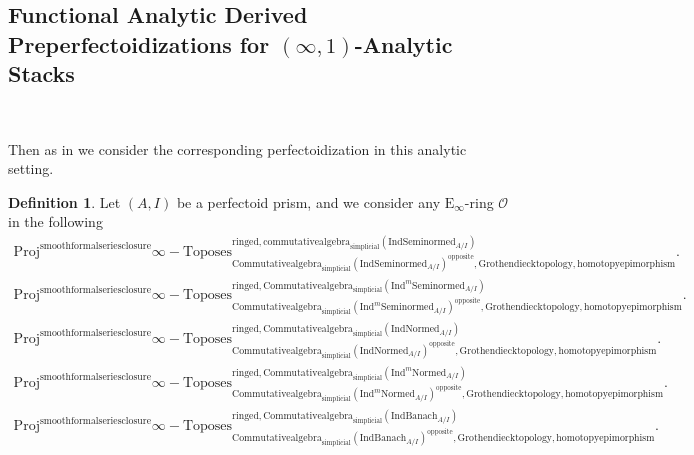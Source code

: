 \documentclass[11pt]{book}
\theoremstyle{definition}
\newtheorem{definition}[theorem]{Definition}
\numberwithin{equation}{section}
\begin{document}
\newpage

\subsection{Functional Analytic Derived Preperfectoidizations for $(\infty,1)$-Analytic Stacks}

\

\noindent Then as in \cite[Definition 8.2]{12BS} we consider the corresponding perfectoidization in this analytic setting. 


\begin{definition}
Let $(A,I)$ be a perfectoid prism, and we consider any $\mathrm{E}_\infty$-ring $\mathcal{O}$ in the following
\begin{align}
\mathrm{Proj}^\text{smoothformalseriesclosure}\infty-\mathrm{Toposes}^{\mathrm{ringed},\mathrm{commutativealgebra}_{\mathrm{simplicial}}(\mathrm{Ind}\mathrm{Seminormed}_{A/I})}_{\mathrm{Commutativealgebra}_{\mathrm{simplicial}}(\mathrm{Ind}\mathrm{Seminormed}_{A/I})^\mathrm{opposite},\mathrm{Grothendiecktopology,homotopyepimorphism}}. \\
\mathrm{Proj}^\text{smoothformalseriesclosure}\infty-\mathrm{Toposes}^{\mathrm{ringed},\mathrm{Commutativealgebra}_{\mathrm{simplicial}}(\mathrm{Ind}^m\mathrm{Seminormed}_{A/I})}_{\mathrm{Commutativealgebra}_{\mathrm{simplicial}}(\mathrm{Ind}^m\mathrm{Seminormed}_{A/I})^\mathrm{opposite},\mathrm{Grothendiecktopology,homotopyepimorphism}}.\\
\mathrm{Proj}^\text{smoothformalseriesclosure}\infty-\mathrm{Toposes}^{\mathrm{ringed},\mathrm{Commutativealgebra}_{\mathrm{simplicial}}(\mathrm{Ind}\mathrm{Normed}_{A/I})}_{\mathrm{Commutativealgebra}_{\mathrm{simplicial}}(\mathrm{Ind}\mathrm{Normed}_{A/I})^\mathrm{opposite},\mathrm{Grothendiecktopology,homotopyepimorphism}}.\\
\mathrm{Proj}^\text{smoothformalseriesclosure}\infty-\mathrm{Toposes}^{\mathrm{ringed},\mathrm{Commutativealgebra}_{\mathrm{simplicial}}(\mathrm{Ind}^m\mathrm{Normed}_{A/I})}_{\mathrm{Commutativealgebra}_{\mathrm{simplicial}}(\mathrm{Ind}^m\mathrm{Normed}_{A/I})^\mathrm{opposite},\mathrm{Grothendiecktopology,homotopyepimorphism}}.\\
\mathrm{Proj}^\text{smoothformalseriesclosure}\infty-\mathrm{Toposes}^{\mathrm{ringed},\mathrm{Commutativealgebra}_{\mathrm{simplicial}}(\mathrm{Ind}\mathrm{Banach}_{A/I})}_{\mathrm{Commutativealgebra}_{\mathrm{simplicial}}(\mathrm{Ind}\mathrm{Banach}_{A/I})^\mathrm{opposite},\mathrm{Grothendiecktopology,homotopyepimorphism}}.\\

\end{align}
\end{definition}
\end{document}
